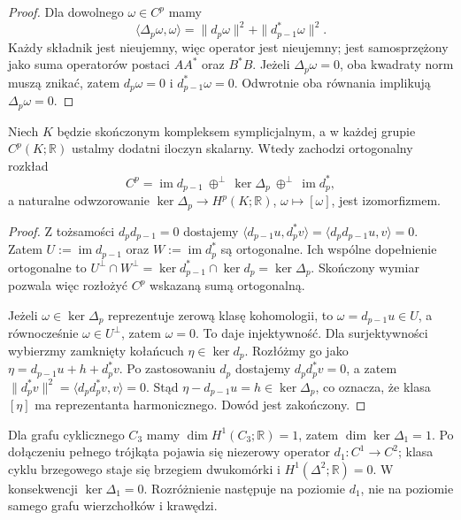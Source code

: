 \begin{proof}
Dla dowolnego $\omega\in C^p$ mamy
\[
\langle\Delta_p\omega,\omega\rangle
=\|d_p\omega\|^2+\|d_{p-1}^*\omega\|^2.
\]
Każdy składnik jest nieujemny, więc operator jest
nieujemny; jest samosprzężony jako suma operatorów
postaci $AA^*$ oraz $B^*B$. Jeżeli $\Delta_p\omega=0$,
oba kwadraty norm muszą znikać, zatem
$d_p\omega=0$ i $d_{p-1}^*\omega=0$.
Odwrotnie oba równania implikują
$\Delta_p\omega=0$.
\end{proof}

\begin{twierdzenie}
\label{thm:tg-finite-hodge}
Niech $K$ będzie skończonym kompleksem symplicjalnym,
a w każdej grupie $C^p(K;\mathbb R)$ ustalmy dodatni
iloczyn skalarny. Wtedy zachodzi ortogonalny rozkład
\[
C^p=\operatorname{im}d_{p-1}
\ \oplus^{\perp}\ \ker\Delta_p
\ \oplus^{\perp}\ \operatorname{im}d_p^*,
\]
a naturalne odwzorowanie
$\ker\Delta_p\to H^p(K;\mathbb R)$,
$\omega\mapsto[\omega]$, jest izomorfizmem.
\end{twierdzenie}

\begin{proof}
Z tożsamości $d_pd_{p-1}=0$ dostajemy
$\langle d_{p-1}u,d_p^*v\rangle
=\langle d_pd_{p-1}u,v\rangle=0$.
Zatem $U:=\operatorname{im}d_{p-1}$ oraz
$W:=\operatorname{im}d_p^*$ są ortogonalne.
Ich wspólne dopełnienie ortogonalne to
$U^\perp\cap W^\perp
=\ker d_{p-1}^*\cap\ker d_p=\ker\Delta_p$.
Skończony wymiar pozwala więc rozłożyć $C^p$
wskazaną sumą ortogonalną.

Jeżeli $\omega\in\ker\Delta_p$ reprezentuje zerową
klasę kohomologii, to $\omega=d_{p-1}u\in U$,
a równocześnie $\omega\in U^\perp$, zatem $\omega=0$.
To daje injektywność. Dla surjektywności wybierzmy
zamknięty kołańcuch $\eta\in\ker d_p$. Rozłóżmy go
jako $\eta=d_{p-1}u+h+d_p^*v$.
Po zastosowaniu $d_p$ dostajemy $d_pd_p^*v=0$,
a zatem $\|d_p^*v\|^2
=\langle d_pd_p^*v,v\rangle=0$.
Stąd $\eta-d_{p-1}u=h\in\ker\Delta_p$,
co oznacza, że klasa $[\eta]$ ma reprezentanta
harmonicznego. Dowód jest zakończony.
\end{proof}

\begin{przyklad}
Dla grafu cyklicznego $C_3$ mamy
$\dim H^1(C_3;\mathbb R)=1$, zatem
$\dim\ker\Delta_1=1$. Po dołączeniu
pełnego trójkąta pojawia się niezerowy operator
$d_1:C^1\to C^2$; klasa cyklu brzegowego staje
się brzegiem dwukomórki i
$H^1(\Delta^2;\mathbb R)=0$.
W konsekwencji $\ker\Delta_1=0$.
Rozróżnienie następuje na poziomie $d_1$,
nie na poziomie samego grafu wierzchołków i krawędzi.
\end{przyklad}

